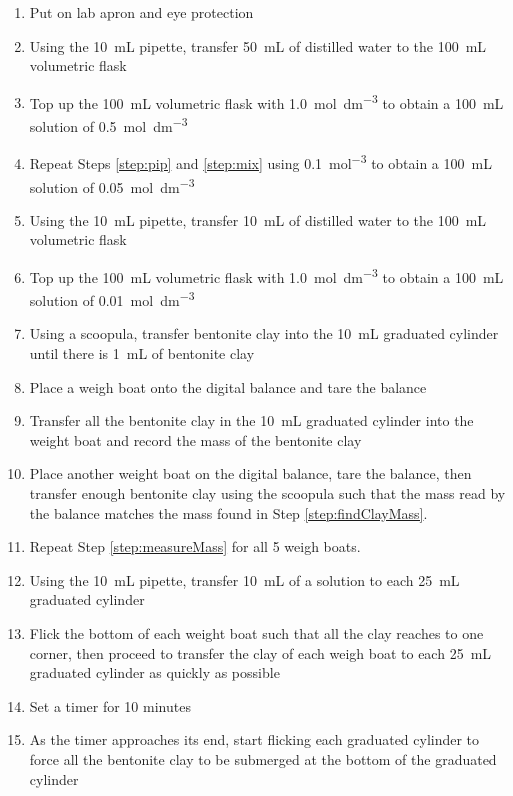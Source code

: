 \documentclass[11pt, letterpaper]{article}
\begin{document}
\begin{enumerate}
    \item Put on lab apron and eye protection
    \item Using the \SI{10}{mL} pipette, transfer \SI{50}{mL} of distilled water to the \SI{100}{mL} volumetric flask \label{step:pip}
    \item Top up the \SI{100}{mL} volumetric flask with \SI{1.0}{mol.dm^{-3}}  to obtain a \SI{100}{mL} solution of \SI{0.5}{mol.dm^{-3}}  \label{step:mix}
    \item Repeat Steps \ref*{step:pip} and \ref*{step:mix} using \SI{0.1}{mol^{-3}}  to obtain a \SI{100}{mL} solution of \SI{0.05}{mol.dm^{-3}} 
    \item Using the \SI{10}{mL} pipette, transfer \SI{10}{mL} of distilled water to the \SI{100}{mL} volumetric flask
    \item Top up the \SI{100}{mL} volumetric flask with \SI{1.0}{mol.dm^{-3}}  to obtain a \SI{100}{mL} solution of \SI{0.01}{mol.dm^{-3}} 
    \item Using a scoopula, transfer bentonite clay into the \SI{10}{mL} graduated cylinder until there is \SI{1}{mL} of bentonite clay
    \item Place a weigh boat onto the digital balance and tare the balance
    \item Transfer all the bentonite clay in the \SI{10}{mL} graduated cylinder into the weight boat and record the mass of the bentonite clay \label{step:findClayMass}
    \item \label{step:measureMass} Place another weight boat on the digital balance, tare the balance, then transfer enough bentonite clay using the scoopula such that the mass read by the balance matches the mass found in Step \ref*{step:findClayMass}.
    \item Repeat Step \ref*{step:measureMass} for all 5 weigh boats.
    \item Using the \SI{10}{mL} pipette, transfer \SI{10}{mL} of a solution to each \SI{25}{mL} graduated cylinder
    \item Flick the bottom of each weight boat such that all the clay reaches to one corner, then proceed to transfer the clay of each weigh boat to each \SI{25}{mL} graduated cylinder as quickly as possible
    \item Set a timer for 10 minutes
    \item As the timer approaches its end, start flicking each graduated cylinder to force all the bentonite clay to be submerged at the bottom of the graduated cylinder

\end{enumerate}
\end{document}

